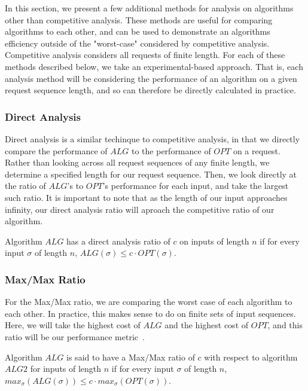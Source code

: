In this section, we present a few additional methods for analysis on algorithms other than competitive analysis. These methods are useful for comparing algorithms to each other, and can be used to demonstrate an algorithms efficiency outside of the "worst-case" considered by competitive analysis. Competitive analysis considers all requests of finite length. For each of these methods described below, we take an experimental-based approach. That is, each analysis method will be considering the performance of an algorithm on a given request sequence length, and so can therefore be directly calculated in practice.

\subsubsection*{Direct Analysis}
\label{sec:Direct}
Direct analysis is a similar techinque to competitive analysis, in that we directly compare the performance of $ALG$ to the performance of $OPT$ on a request. Rather than looking across all request sequences of any finite length, we determine a specified length for our request sequence. Then, we look directly at the ratio of $ALG$'s to $OPT$'s performance for each input, and take the largest such ratio. It is important to note that as the length of our input approaches infinity, our direct analysis ratio will aproach the competitive ratio of our algorithm.

\begin{definition}
    \label{def:direct}
    Algorithm $ALG$ has a direct analysis ratio of $c$ on inputs of length $n$ if for every input $\sigma$ of length $n$, $ALG(\sigma) \leq c\cdot OPT(\sigma)$.
\end{definition}

\subsubsection*{Max/Max Ratio}
\label{sec:MaxMax}
For the Max/Max ratio, we are comparing the worst case of each algorithm to each other. In practice, this makes sense to do on finite sets of input sequences. Here, we will take the highest cost of $ALG$ and the highest cost of $OPT$, and this ratio will be our performance metric~\cite{MAXMAX2005}. 

\begin{definition}
    Algorithm $ALG$ is said to have a Max/Max ratio of $c$ with respect to algorithm $ALG2$ for inputs of length $n$ if for every input $\sigma$ of length $n$, $max_{\sigma}(ALG(\sigma)) \leq c\cdot max_{\sigma}(OPT(\sigma))$.
\end{definition}

